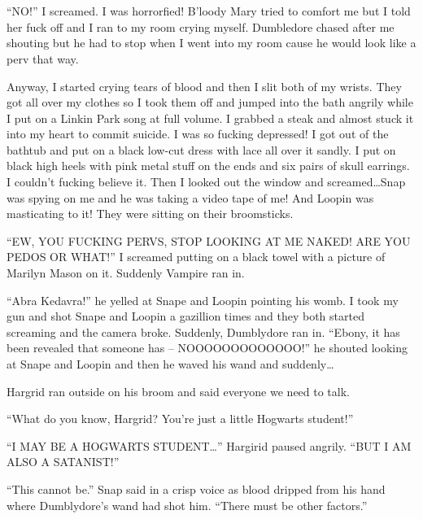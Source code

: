 \section{\chaptername~\thesection}



\enquote{NO\@!} I screamed. I was horrorfied! B'loody Mary tried to comfort me but I told her fuck off and I ran to my room crying myself. Dumbledore chased after me shouting but he had to stop when I went into my room cause he would look like a perv that way.

Anyway, I started crying tears of blood and then I slit both of my wrists. They got all over my clothes so I took them off and jumped into the bath angrily while I put on a Linkin Park song at full volume. I grabbed a steak and almost stuck it into my heart to commit suicide. I was so fucking depressed! I got out of the bathtub and put on a black low-cut dress with lace all over it sandly. I put on black high heels with pink metal stuff on the ends and six pairs of skull earrings. I couldn't fucking believe it. Then I looked out the window and screamed\ldots Snap was spying on me and he was taking a video tape of me! And Loopin was masticating to it! They were sitting on their broomsticks.

\enquote{EW, YOU FUCKING PERVS, STOP LOOKING AT ME NAKED! ARE YOU PEDOS OR WHAT\@!} I screamed putting on a black towel with a picture of Marilyn Mason on it. Suddenly Vampire ran in.

\enquote{Abra Kedavra!} he yelled at Snape and Loopin pointing his womb. I took my gun and shot Snape and Loopin a gazillion times and they both started screaming and the camera broke. Suddenly, Dumblydore ran in. \enquote{Ebony, it has been revealed that someone has -- NOOOOOOOOOOOOO\@!} he shouted looking at Snape and Loopin and then he waved his wand and suddenly\ldots

Hargrid ran outside on his broom and said everyone we need to talk.

\enquote{What do you know, Hargrid? You're just a little Hogwarts student!}

\enquote{I MAY BE A HOGWARTS STUDENT\ldots} Hargirid paused angrily. \enquote{BUT I AM ALSO A SATANIST\@!}

\enquote{This cannot be.} Snap said in a crisp voice as blood dripped from his hand where Dumblydore's wand had shot him. \enquote{There must be other factors.}

